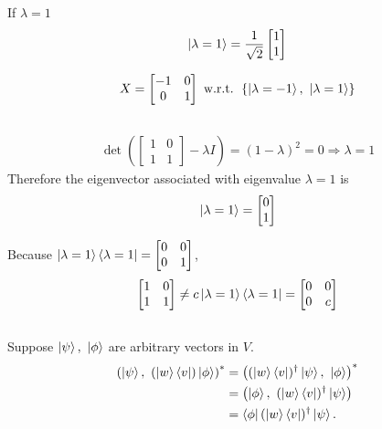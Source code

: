 If $\lambda = 1$
\begin{align}
	\ket{\lambda = 1} = \frac{1}{\sqrt{2}} 
	\begin{bmatrix}
	1 \\ 
	1 
	\end{bmatrix}
\end{align}

\begin{align}
	X = \begin{bmatrix}
	-1 & 0 \\ 
	0 & 1
	\end{bmatrix} 
	\text{ w.r.t. } \left\{ \ket{\lambda = -1},\ \ket{\lambda = 1}\right\}
\end{align}



\subsection{}
\begin{align}
	\det \left(\begin{bmatrix}
	1 & 0 \\ 
	1 & 1
	\end{bmatrix} - \lambda I \right) = (1 - \lambda)^2 = 0 \Rightarrow \lambda = 1
\end{align}
Therefore the eigenvector associated with eigenvalue $\lambda = 1$ is 
\begin{align}
	\ket{\lambda = 1} = \begin{bmatrix}
	0 \\ 
	1
	\end{bmatrix} 
\end{align}

Because $\ket{\lambda = 1}\bra{\lambda = 1} = \begin{bmatrix}
0 & 0 \\ 
0 & 1
\end{bmatrix}$, 
\begin{align}
	\begin{bmatrix}
	1 & 0 \\ 
	1 & 1
	\end{bmatrix} \neq c\ket{\lambda = 1}\bra{\lambda = 1} = \begin{bmatrix}
	0 & 0 \\ 
	0 & c
	\end{bmatrix}
\end{align}



\subsection{}
Suppose $\ket{\psi},\ \ket{\phi}$ are arbitrary vectors in $V$.
\begin{align}
	\left(\ket{\psi},\ (\ket{w}\bra{v}) \ket{\phi}\right)^* &=
	\left((\ket{w}\bra{v})^\dagger \ket{\psi},\  \ket{\phi}\right)^*\\
	&= \left(\ket{\phi},\ (\ket{w}\bra{v})^\dagger \ket{\psi} \right)\\
	&= \bra{\phi} (\ket{w}\bra{v})^\dagger \ket{\psi}.
\end{align}

